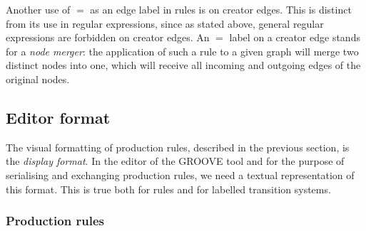 Another use of $=$ as an edge label in rules is on creator edges. This is
distinct from its use in regular expressions, since as stated above, general
regular expressions are forbidden on creator edges. An $=$ label on a creator
edge stands for a \emph{node merger}: the application of such a rule to a given
graph will merge two distinct nodes into one, which will receive all incoming
and outgoing edges of the original nodes.

\subsection{Editor format}

The visual formatting of production rules, described in the previous section,
is the \emph{display format}. In the editor of the GROOVE tool and for the
purpose of serialising and exchanging production rules, we need a textual
representation of this format. This is true both for rules and for labelled
transition systems.

\subsubsection{Production rules}

